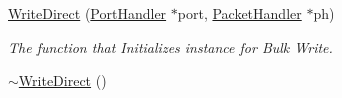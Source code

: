 \begin{DoxyCompactItemize}
\item 
\hyperlink{classmercury_1_1_write_direct_ad5dfc421f4d06ca13dd6e2ffa1b0b121}{Write\+Direct} (\hyperlink{classmercury_1_1_port_handler}{Port\+Handler} $\ast$port, \hyperlink{classmercury_1_1_packet_handler}{Packet\+Handler} $\ast$ph)
\begin{DoxyCompactList}\small\item\em The function that Initializes instance for Bulk Write. \end{DoxyCompactList}\item 
\hyperlink{classmercury_1_1_write_direct_a7da922c3909a6202de21099b729900e5}{$\sim$\+Write\+Direct} ()\hypertarget{classmercury_1_1_write_direct_a7da922c3909a6202de21099b729900e5}{}\label{classmercury_1_1_write_direct_a7da922c3909a6202de21099b729900e5}


\end{DoxyCompactItemize}
